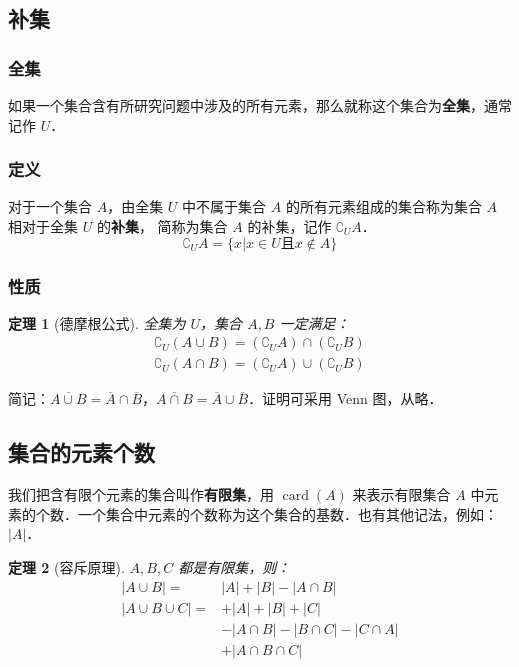 \documentclass[a4paper,openany]{ctexbook}
\newtheorem{thmlevel1}{定理}
\DeclareMathOperator{\card}{card}
\begin{document}
\subsection{补集}

\subsubsection{全集}

如果一个集合含有所研究问题中涉及的所有元素，那么就称这个集合为\textbf{全集}，通常记作 \(U\)．

\subsubsection{定义}

对于一个集合 \(A\)，由全集 \(U\) 中不属于集合 \(A\) 的所有元素组成的集合称为集合 \(A\) 相对于全集 \(U\) 的\textbf{补集}，
简称为集合 \(A\) 的补集，记作 \(\complement_U A\)．
\[
    \complement_U A = \{x| x\in U \text{且}x\not\in A\}
\]

\subsubsection{性质}

\begin{thmlevel1}[德摩根公式]\label{thm:demorgan}
    全集为 \(U\)，集合 \(A,B\) 一定满足：
    \begin{gather*}
        \complement_U(A\cup B)=(\complement_U A)\cap(\complement_U B)\\
        \complement_U(A\cap B)=(\complement_U A)\cup(\complement_U B)
    \end{gather*}
\end{thmlevel1}

简记：\(\overline{A\cup B}=\overline{A}\cap \overline{B}\)，\(\overline{A\cap B}=\overline{A}\cup \overline{B} \)．证明可采用 Venn 图，从略．

\subsection{集合的元素个数}

我们把含有限个元素的集合叫作\textbf{有限集}，用 \(\card(A)\) 来表示有限集合 \(A\) 中元素的个数．一个集合中元素的个数称为这个集合的基数．也有其他记法，例如：\(|A|\)．

\begin{thmlevel1}[容斥原理]
    \(A,B,C\) 都是有限集，则：
    \begin{align*}
        |A\cup B|={}       & |A|+|B|-|A\cap B|               \\
        |A\cup B\cup C|={} & + |A|+|B|+|C|                   \\
                           & - |A\cap B|-|B\cap C|-|C\cap A| \\
                           & + |A\cap B\cap C|
    \end{align*}
\end{thmlevel1}
\end{document}
